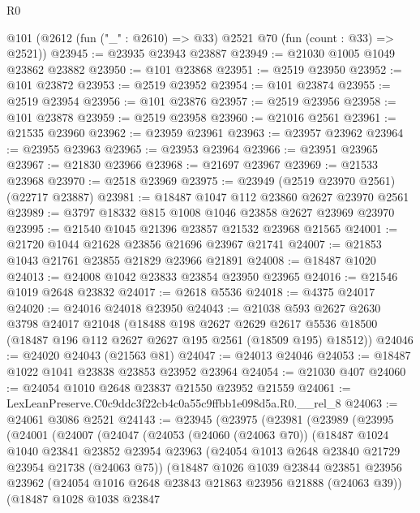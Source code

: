 \begin{lexlean}{R0}
\begin{coremodule}
  @101 (@2612 (fun ("_" : @2610) => @33) @2521 @70 (fun (count : @33) => @2521))
@23945 := @23935 @23943 @23887
@23949 := @21030 @1005 @1049 @23862 @23882
@23950 := @101 @23868
@23951 := @2519 @23950
@23952 := @101 @23872
@23953 := @2519 @23952
@23954 := @101 @23874
@23955 := @2519 @23954
@23956 := @101 @23876
@23957 := @2519 @23956
@23958 := @101 @23878
@23959 := @2519 @23958
@23960 := @21016 @2561
@23961 := @21535 @23960
@23962 := @23959 @23961
@23963 := @23957 @23962
@23964 := @23955 @23963
@23965 := @23953 @23964
@23966 := @23951 @23965
@23967 := @21830 @23966
@23968 := @21697 @23967
@23969 := @21533 @23968
@23970 := @2518 @23969
@23975 := @23949 (@2519 @23970 @2561) (@22717 @23887)
@23981 := @18487 @1047 @112 @23860 @2627 @23970 @2561
@23989 := @3797 @18332 @815 @1008 @1046 @23858 @2627 @23969 @23970
@23995 := @21540 @1045 @21396 @23857 @21532 @23968 @21565
@24001 := @21720 @1044 @21628 @23856 @21696 @23967 @21741
@24007 := @21853 @1043 @21761 @23855 @21829 @23966 @21891
@24008 := @18487 @1020
@24013 := @24008 @1042 @23833 @23854 @23950 @23965
@24016 := @21546 @1019 @2648 @23832
@24017 := @2618 @5536
@24018 := @4375 @24017
@24020 := @24016 @24018 @23950
@24043 := @21038
    @593
    @2627
    @2630
    @3798
    @24017
    @21048
    (@18488
      @198
      @2627
      @2629
      @2617
      @5536
      @18500
      (@18487 @196 @112 @2627 @2627 @195 @2561 (@18509 @195) @18512))
@24046 := @24020 @24043 (@21563 @81)
@24047 := @24013 @24046
@24053 := @18487 @1022 @1041 @23838 @23853 @23952 @23964
@24054 := @21030 @407
@24060 := @24054 @1010 @2648 @23837 @21550 @23952 @21559
@24061 := LexLeanPreserve.C0c9ddc3f22cb4c0a55c9ffbb1e098d5a.R0.__rel_8
@24063 := @24061 @3086 @2521
@24143 := @23945
    (@23975
      (@23981
        (@23989
          (@23995
            (@24001
              (@24007
                (@24047
                  (@24053
                    (@24060 (@24063 @70))
                    (@18487
                      @1024
                      @1040
                      @23841
                      @23852
                      @23954
                      @23963
                      (@24054 @1013 @2648 @23840 @21729 @23954 @21738 (@24063 @75))
                      (@18487
                        @1026
                        @1039
                        @23844
                        @23851
                        @23956
                        @23962
                        (@24054 @1016 @2648 @23843 @21863 @23956 @21888 (@24063 @39))
                        (@18487
                          @1028
                          @1038
                          @23847

\end{coremodule}
\end{lexlean}
